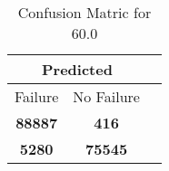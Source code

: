 \begin{table}[] 
\caption{Confusion Matric for 60.0} 
\label{Table: Prediction Accuracy-DMD60.0OnlySunEKF-ignoreReflectionEKF-top2perfectNoFailurePrediction-Reflection} 
\centering 
\begin{tabular} 
 {@{}ccc@{}} 
\toprule 
\multicolumn{2}{c}{\textbf{Predicted}}
 \\ \midrule 
\multicolumn{1}{|c|}{Failure} & 
\multicolumn{1}{c|}{No Failure}
 \\ \midrule 
\multicolumn{1}{|c|}{\color{green}\textbf{88887}} & 
\multicolumn{1}{c|}{\color{red}\textbf{416}}
 \\ \midrule 
\multicolumn{1}{|c|}{\color{red}\textbf{5280}} & 
\multicolumn{1}{c|}{\color{green}\textbf{75545}}
 \\ \bottomrule 
\end{tabular} 
\end{table} 

